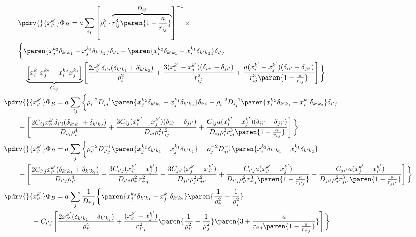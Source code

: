 \documentclass[onecolumn,amsmath,amssymb,nofootinbib,floatfix]{revtex4}
\begin{document}
$$
\begin{aligned}
&\qquad\pdrv{}{x_{i'}^{k'}}\Phi_{B} = a\sum_{ij} \left[\rho_i^2\cdot\overbrace{r_{ij}^3\paren{1-\frac{a}{r_{ij}}}}^{D_{ij}}\right]^{-1}\times \\ &\qquad\bigg\{\paren{x_j^{k_2}\delta_{k'k_1}-x_j^{k_1}\delta_{k'k_2}}\delta_{i'i} - \paren{x_i^{k_2}\delta_{k'k_1}-x_i^{k_1}\delta_{k'k_2}}\delta_{i'j} \\
&\qquad- \underbrace{\left[x_i^{k_1}x_j^{k_2}-x_i^{k_2}x_j^{k_1}\right]}_{C_{ij}}\left[\frac{2x_{i'}^{k'}\delta_{i'i}(\delta_{k'k_1} + \delta_{k'k_2})}{\rho_i^2}
      +\frac{3(x_i^{k'}-x_j^{k'})(\delta_{ii'}-\delta_{ji'})}{r_{ij}^2}
      + \frac{a (x_i^{k'}-x_j^{k'})(\delta_{ii'}-\delta_{ji'})}{r_{ij}^3\paren{1-\frac{a}{r_{ij}}}}\right]\bigg\}\\
&\pdrv{}{x_{i'}^{k'}}\Phi_{B} = a\sum_{ij} \bigg\{\rho_i^{-2}D_{ij}^{-1}\paren{x_j^{k_2}\delta_{k'k_1}-x_j^{k_1}\delta_{k'k_2}}\delta_{i'i}
            -\rho_i^{-2}D_{ij}^{-1}\paren{x_i^{k_2}\delta_{k'k_1}-x_i^{k_1}\delta_{k'k_2}}\delta_{i'j} \\
&\qquad- \left[\frac{2C_{ij}x_{i'}^{k'}\delta_{i'i}(\delta_{k'k_1} + \delta_{k'k_2})}{D_{ij}\rho_i^4}
      +\frac{3C_{ij}(x_i^{k'}-x_j^{k'})(\delta_{ii'}-\delta_{ji'})}{D_{ij}\rho_i^2 r_{ij}^2}
      + \frac{C_{ij}a (x_i^{k'}-x_j^{k'})(\delta_{ii'}-\delta_{ji'})}{D_{ij}\rho_i^2 r_{ij}^3\paren{1-\frac{a}{r_{ij}}}}\right]\bigg\}\\
&\pdrv{}{x_{i'}^{k'}}\Phi_{B} = a\sum_{j} \bigg\{\rho_{i'}^{-2}D_{i'j}^{-1}\paren{x_j^{k_2}\delta_{k'k_1}-x_j^{k_1}\delta_{k'k_2}}
                    -\rho_j^{-2}D_{j{i'}}^{-1}\paren{x_i^{k_2}\delta_{k'k_1}-x_i^{k_1}\delta_{k'k_2}} \\
&\qquad- \left[\frac{2C_{i'j}x_{i'}^{k'}(\delta_{k'k_1} + \delta_{k'k_2})}{D_{i'j}\rho_{i'}^4}
      +\frac{3C_{i'j}(x_{i'}^{k'}-x_j^{k'})}{D_{i'j}\rho_{i'}^2 r_{i'j}^2}-\frac{3C_{ji'}(x_j^{k'}-x_{i'}^{k'})}{D_{ji'}\rho_j^2 r_{ji'}^2}
      + \frac{C_{i'j}a (x_{i'}^{k'}-x_j^{k'})}{D_{i'j}\rho_{i'}^2 r_{i'j}^3\paren{1-\frac{a}{r_{i'j}}}}- \frac{C_{ji'}a (x_j^{k'}-x_{i'}^{k'})}{D_{ji'}\rho_j^2 r_{ji'}^3\paren{1-\frac{a}{r_{ji'}}}}
      \right]\bigg\}\\
&\pdrv{}{x_{i'}^{k'}}\Phi_{B} = a\sum_{j}\frac{1}{D_{i'j}}\bigg\{\paren{x_j^{k_2}\delta_{k'k_1}-x_j^{k_1}\delta_{k'k_2}}\paren{\frac{1}{\rho_{i'}^2}-\frac{1}{\rho_j^2}} \\
&\qquad\qquad
      - C_{i'j}\left[\frac{2x_{i'}^{k'}(\delta_{k'k_1} + \delta_{k'k_2})}{\rho_{i'}^4}
      +\frac{(x_{i'}^{k'}-x_j^{k'})}{r_{i'j}^2}\paren{\frac{1}{\rho_{i'}^2}-\frac{1}{\rho_j^2}}\paren{3+\frac{a}{r_{i'j}\paren{1-\frac{a}{r_{i'j}}}}}
      \right]\bigg\}\\
\end{aligned}
$$
\end{document}
